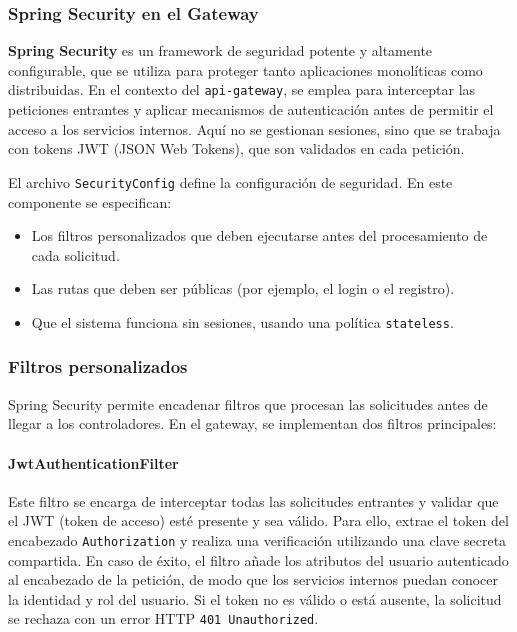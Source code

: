 \subsubsection{Spring Security en el Gateway}

\textbf{Spring Security} es un framework de seguridad potente y altamente configurable, que se utiliza para proteger tanto aplicaciones monolíticas como distribuidas. En el contexto del \texttt{api-gateway}, se emplea para interceptar las peticiones entrantes y aplicar mecanismos de autenticación antes de permitir el acceso a los servicios internos. Aquí no se gestionan sesiones, sino que se trabaja con tokens JWT (JSON Web Tokens), que son validados en cada petición.

El archivo \texttt{SecurityConfig} define la configuración de seguridad. En este componente se especifican:
\begin{itemize}
  \item Los filtros personalizados que deben ejecutarse antes del procesamiento de cada solicitud.
  \item Las rutas que deben ser públicas (por ejemplo, el login o el registro).
  \item Que el sistema funciona sin sesiones, usando una política \texttt{stateless}.
\end{itemize}

\subsubsection{Filtros personalizados}

Spring Security permite encadenar filtros que procesan las solicitudes antes de llegar a los controladores. En el gateway, se implementan dos filtros principales:

\paragraph{JwtAuthenticationFilter} Este filtro se encarga de interceptar todas las solicitudes entrantes y validar que el JWT (token de acceso) esté presente y sea válido. Para ello, extrae el token del encabezado \texttt{Authorization} y realiza una verificación utilizando una clave secreta compartida. En caso de éxito, el filtro añade los atributos del usuario autenticado al encabezado de la petición, de modo que los servicios internos puedan conocer la identidad y rol del usuario. Si el token no es válido o está ausente, la solicitud se rechaza con un error HTTP \texttt{401 Unauthorized}.

